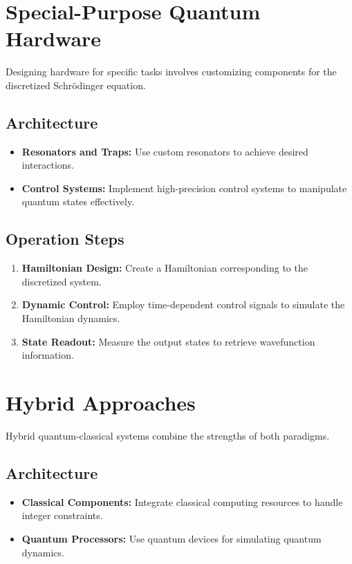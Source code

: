 \documentclass{article}
\begin{document}
\section{Special-Purpose Quantum Hardware}

Designing hardware for specific tasks involves customizing components for the discretized Schrödinger equation.

\subsection{Architecture}
\begin{itemize}
    \item \textbf{Resonators and Traps:} Use custom resonators to achieve desired interactions.
    \item \textbf{Control Systems:} Implement high-precision control systems to manipulate quantum states effectively.
\end{itemize}

\subsection{Operation Steps}
\begin{enumerate}
    \item \textbf{Hamiltonian Design:} Create a Hamiltonian corresponding to the discretized system.
    \item \textbf{Dynamic Control:} Employ time-dependent control signals to simulate the Hamiltonian dynamics.
    \item \textbf{State Readout:} Measure the output states to retrieve wavefunction information.
\end{enumerate}

\section{Hybrid Approaches}

Hybrid quantum-classical systems combine the strengths of both paradigms.

\subsection{Architecture}
\begin{itemize}
    \item \textbf{Classical Components:} Integrate classical computing resources to handle integer constraints.
    \item \textbf{Quantum Processors:} Use quantum devices for simulating quantum dynamics.
\end{itemize}
\end{document}
